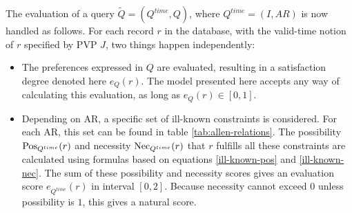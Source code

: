 The evaluation of a query $\tilde{Q} = \left( Q^{time}, Q \right)$, where $Q^{time} = \left( I, AR \right)$ is now handled as follows. For each record $r$ in the database, with the valid-time notion of $r$ specified by PVP $J$, two things happen independently:



\begin{itemize}
\item
The preferences expressed in $Q$ are evaluated, resulting in a satisfaction degree denoted here $e_{Q}(r)$. The model presented here accepts any way of calculating this evaluation, as long as $e_{Q}(r) \in \left[0,1\right]$. 
\item
Depending on AR, a specific set of ill-known constraints is considered. For each AR, this set can be found in table \ref{tab:allen-relations}. The possibility $\operatorname{Pos}_{Q^{time}}(r)$ and necessity $\operatorname{Nec}_{Q^{time}}(r)$ that $r$ fulfills all these constraints are calculated using formulas based on equations \eqref{ill-known-pos} and \eqref{ill-known-nec}. The sum of these possibility and necessity scores gives an evaluation score $e_{Q^{time}}(r)$ in interval $\left[0,2\right]$. Because necessity cannot exceed $0$ unless possibility is $1$, this gives a natural score.
\end{itemize}


